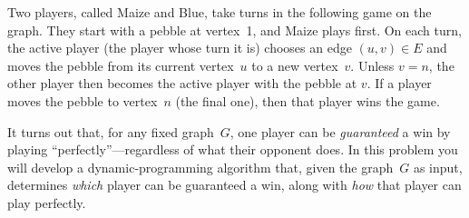 \documentclass[11pt,addpoints]{exam}
\begin{document}
\begin{questions}
  Two players, called Maize and Blue, take turns in the following game on the graph.
  They start with a pebble at vertex~1, and Maize plays first.
  On each turn, the active player (the player whose turn it is) chooses an edge $(u,v) \in E$ and moves the pebble from its current vertex~$u$ to a new vertex~$v$. Unless $v=n$, the other player then becomes the active player with the pebble at $v$. If a player moves the pebble to vertex~$n$ (the final one), then that player wins the game.

  It turns out that, for any fixed graph~$G$, one player can be \emph{guaranteed} a win by playing ``perfectly''---regardless of what their opponent does.
  In this problem you will develop a dynamic-programming algorithm that, given the graph~$G$ as input, determines \emph{which} player can be guaranteed a win, along with \emph{how} that player can play perfectly.
    
\end{questions}
\end{document}
